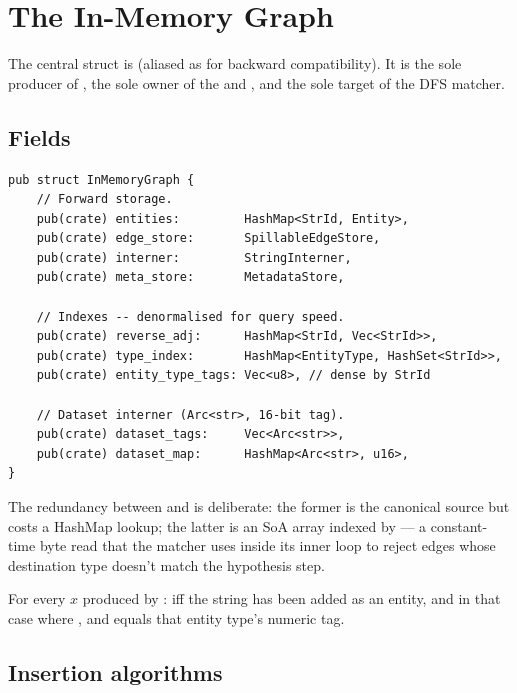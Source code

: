 \chapter{The In-Memory Graph}
\label{ch:graph-hunter}

The central struct is \Graph{} (aliased as  for
backward compatibility). It is the sole producer of
, the sole owner of the 
and , and the sole target of the DFS matcher.

\section{Fields}

\begin{lstlisting}[style=rust]
pub struct InMemoryGraph {
    // Forward storage.
    pub(crate) entities:         HashMap<StrId, Entity>,
    pub(crate) edge_store:       SpillableEdgeStore,
    pub(crate) interner:         StringInterner,
    pub(crate) meta_store:       MetadataStore,

    // Indexes -- denormalised for query speed.
    pub(crate) reverse_adj:      HashMap<StrId, Vec<StrId>>,
    pub(crate) type_index:       HashMap<EntityType, HashSet<StrId>>,
    pub(crate) entity_type_tags: Vec<u8>, // dense by StrId

    // Dataset interner (Arc<str>, 16-bit tag).
    pub(crate) dataset_tags:     Vec<Arc<str>>,
    pub(crate) dataset_map:      HashMap<Arc<str>, u16>,
}
\end{lstlisting}

The redundancy between  and
 is deliberate: the former is the
canonical source but costs a HashMap lookup; the latter is an
SoA array indexed by  --- a constant-time
byte read that the matcher uses inside its inner loop to reject
edges whose destination type doesn't match the hypothesis step.

\begin{invariant}
For every \StrId{} $x$ produced by :
 iff the string has been added
as an entity, and in that case 
where , and
 equals that entity type's
numeric tag.
\end{invariant}

\section{Insertion algorithms}

